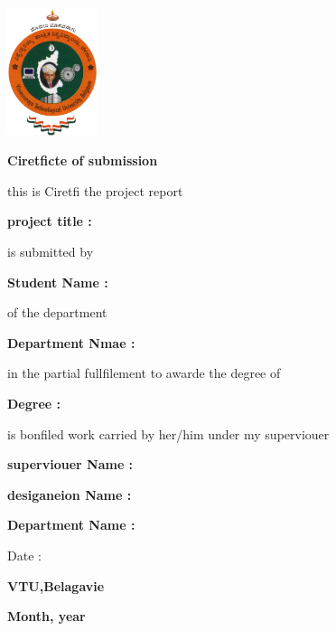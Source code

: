 \documentclass[a4paper,12pt]{report}
\begin{document}
\begin{titlepage}
    \centering
    \includegraphics[width=0.2\textwidth]{puneeth1.png}\par\vspace{1cm}
    \vspace{1cm}
    {\large\bfseries Ciretficte of submission\par}
    \vspace{1.5cm}
    \begin{flushleft}
        \large
        this is Ciretfi the project report\par
        \textbf{project title :\underline{\hspace{7cm}}}\par
        is submitted by\par
        \textbf{Student Name :\underline{\hspace{7cm}}}\par
        of the department\par
        \textbf{Department Nmae :\underline{\hspace{7cm}}}\par
        in the partial fullfilement to awarde the degree of\par
        \textbf{Degree :\underline{\hspace{7cm}}}\par
        is bonfiled work carried by her/him under my superviouer\par
    \end{flushleft}
    \vspace{2cm}
    \begin{flushright}
        \large
        \begin{flushright}
            \large
            \textbf{superviouer Name :\underline{\hspace{7cm}}}\par
            \textbf{desiganeion Name :\underline{\hspace{7cm}}}\par
            \textbf{Department Name :\underline{\hspace{7cm}}}\par
            \vspace{0.5cm}
            \large
            Date :\underline{\hspace{7cm}}\par
        \end{flushright}
        \vspace{2cm}
        \begin{center}
            \large
            \textbf{VTU,Belagavie}\par
            \large
            \textbf{Month, year}
        \end{center}
    \end{flushright}
\end{titlepage}
\end{document}
